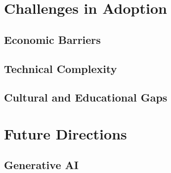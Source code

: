     \section{Challenges in Adoption}
        \subsection{Economic Barriers}
        \subsection{Technical Complexity}
        \subsection{Cultural and Educational Gaps}
    \section{Future Directions}
        \subsection{Generative AI}